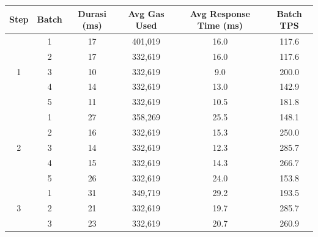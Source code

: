 \begin{table}[h!]
  \centering
  \begin{tabular}{|c|c|c|c|c|c|}
    \hline
    \textbf{Step}      & \textbf{Batch} & \textbf{Durasi (ms)} & \textbf{Avg Gas Used} & \textbf{Avg Response Time (ms)} & \textbf{Batch TPS} \\
    \hline
    \multirow{5}{*}{1} & 1              & 17                   & 401,019               & 16.0                            & 117.6              \\
                       & 2              & 17                   & 332,619               & 16.0                            & 117.6              \\
                       & 3              & 10                   & 332,619               & 9.0                             & 200.0              \\
                       & 4              & 14                   & 332,619               & 13.0                            & 142.9              \\
                       & 5              & 11                   & 332,619               & 10.5                            & 181.8              \\
    \hline
    \multirow{5}{*}{2} & 1              & 27                   & 358,269               & 25.5                            & 148.1              \\
                       & 2              & 16                   & 332,619               & 15.3                            & 250.0              \\
                       & 3              & 14                   & 332,619               & 12.3                            & 285.7              \\
                       & 4              & 15                   & 332,619               & 14.3                            & 266.7              \\
                       & 5              & 26                   & 332,619               & 24.0                            & 153.8              \\
    \hline
    \multirow{5}{*}{3} & 1              & 31                   & 349,719               & 29.2                            & 193.5              \\
                       & 2              & 21                   & 332,619               & 19.7                            & 285.7              \\
                       & 3              & 23                   & 332,619               & 20.7                            & 260.9              \\

\end{tabular}
\end{table}
